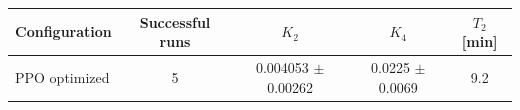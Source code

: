 \begin{tabular}{lcccc}
\toprule
Configuration & Successful runs & $K_2$ & $K_4$ & $T_2$ [min] \\
\midrule
PPO optimized & 5 & 0.004053 $\pm$ 0.00262 & 0.0225 $\pm$ 0.0069 & 9.2 \\
\bottomrule
\end{tabular}
